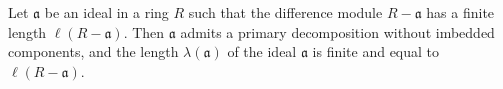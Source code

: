 Let $\mathfrak{a}$ be an ideal in a ring $R$ such that the difference module $R - \mathfrak{a}$ has a finite length $\ell(R - \mathfrak{a})$. Then $\mathfrak{a}$ admits a primary decomposition without imbedded components, and the length $\lambda(\mathfrak{a})$ of the ideal $\mathfrak{a}$ is finite and equal to $\ell(R - \mathfrak{a})$.
